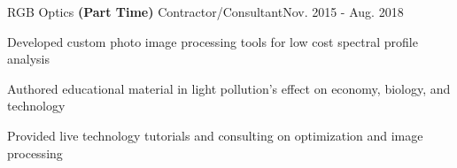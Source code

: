\documentclass{article}
\newenvironment{**mylist}[2]{
  \subsubsection*{#1\hfill\small#2}
  \small
  \begin{list}{}{}
    \setlength{\topsep}{0pt}
   \setlength{\itemsep}{1pt}
   \setlength{\parskip}{0pt}
   \setlength{\parsep}{0pt}}{\end{list}\normalsize}
\newcommand{\LU}[1]{\hspace{-1em}{\bf Technologies : #1}}
\def\PT{{\bf(Part Time)}\xspace}
\begin{document}
\begin{**mylist}{RGB Optics \PT %
    \tabb Contractor/Consultant}{Nov. 2015 - Aug. 2018}
\item Developed custom photo image processing tools for low cost spectral profile analysis
\item Authored educational material in light pollution's effect on economy, biology, and technology
\item Provided live technology tutorials and consulting on optimization and image processing
\item \LU{Python, numpy, skimage, AWS, PostgreSQL%
}
\end{**mylist}
\end{document}
